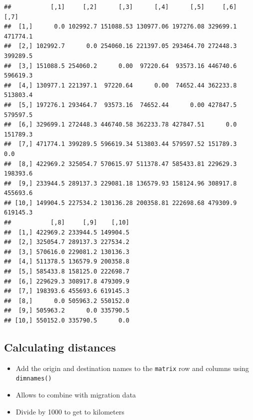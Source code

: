 \documentclass[
]{book}
\newenvironment{Shaded}{\begin{snugshade}}{\end{snugshade}}
\newcommand{\AttributeTok}[1]{\textcolor[rgb]{0.77,0.63,0.00}{#1}}
\newcommand{\DecValTok}[1]{\textcolor[rgb]{0.00,0.00,0.81}{#1}}
\newcommand{\FunctionTok}[1]{\textcolor[rgb]{0.00,0.00,0.00}{#1}}
\newcommand{\NormalTok}[1]{#1}
\newcommand{\OtherTok}[1]{\textcolor[rgb]{0.56,0.35,0.01}{#1}}
\newcommand{\SpecialCharTok}[1]{\textcolor[rgb]{0.00,0.00,0.00}{#1}}
\providecommand{\tightlist}{%
  \setlength{\itemsep}{0pt}\setlength{\parskip}{0pt}}
\begin{document}
\begin{verbatim}
##           [,1]     [,2]      [,3]      [,4]      [,5]     [,6]     [,7]
##  [1,]      0.0 102992.7 151088.53 130977.06 197276.08 329699.1 471774.1
##  [2,] 102992.7      0.0 254060.16 221397.05 293464.70 272448.3 399289.5
##  [3,] 151088.5 254060.2      0.00  97220.64  93573.16 446740.6 596619.3
##  [4,] 130977.1 221397.1  97220.64      0.00  74652.44 362233.8 513803.4
##  [5,] 197276.1 293464.7  93573.16  74652.44      0.00 427847.5 579597.5
##  [6,] 329699.1 272448.3 446740.58 362233.78 427847.51      0.0 151789.3
##  [7,] 471774.1 399289.5 596619.34 513803.44 579597.52 151789.3      0.0
##  [8,] 422969.2 325054.7 570615.97 511378.47 585433.81 229629.3 198393.6
##  [9,] 233944.5 289137.3 229081.18 136579.93 158124.96 308917.8 455693.6
## [10,] 149904.5 227534.2 130136.28 200358.81 222698.68 479309.9 619145.3
##           [,8]     [,9]    [,10]
##  [1,] 422969.2 233944.5 149904.5
##  [2,] 325054.7 289137.3 227534.2
##  [3,] 570616.0 229081.2 130136.3
##  [4,] 511378.5 136579.9 200358.8
##  [5,] 585433.8 158125.0 222698.7
##  [6,] 229629.3 308917.8 479309.9
##  [7,] 198393.6 455693.6 619145.3
##  [8,]      0.0 505963.2 550152.0
##  [9,] 505963.2      0.0 335790.5
## [10,] 550152.0 335790.5      0.0
\end{verbatim}

\hypertarget{calculating-distances-3}{%
\subsection{Calculating distances}\label{calculating-distances-3}}

\begin{itemize}
\tightlist
\item
  Add the origin and destination names to the \texttt{matrix} row and columns using \texttt{dimnames()}
\item
  Allows to combine with migration data
\item
  Divide by 1000 to get to kilometers
\end{itemize}

\begin{Shaded}
\end{Shaded}
\end{document}
